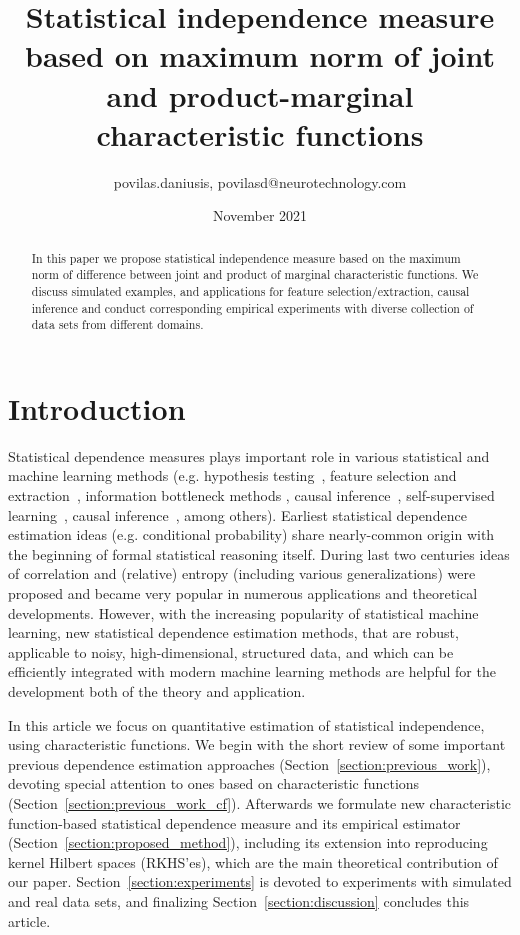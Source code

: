 \documentclass{article}
\title{Statistical independence measure based on maximum norm of joint and product-marginal characteristic functions}
\author{povilas.daniusis, povilasd@neurotechnology.com}
\date{November 2021}
\begin{document}
\maketitle

%

\begin{abstract}
    In this paper we propose statistical independence measure based on the maximum norm of difference between joint and product of marginal characteristic functions. We discuss simulated examples, and applications for feature selection/extraction, causal inference and conduct corresponding empirical experiments with diverse collection of data sets from different domains.
\end{abstract}

\section{Introduction}
Statistical dependence measures plays important role in various statistical and machine learning methods (e.g. hypothesis testing~\cite{Gretton2005MeasuringSD}, feature selection and extraction~\cite{EigenHSIC}, information bottleneck methods \cite{Ma2020TheHB}, causal inference~\cite{NIPS2008_f7664060}, self-supervised learning~\cite{li2021selfsupervised}, causal inference~\cite{NIPS2008_f7664060}, among others).  Earliest statistical dependence estimation ideas (e.g. conditional probability) share nearly-common origin with the beginning of formal statistical reasoning itself. During last two centuries ideas of correlation and (relative) entropy (including various generalizations) were proposed and became very popular in numerous applications and theoretical developments. However, with the increasing popularity of statistical machine learning, new statistical dependence estimation methods, that are robust, applicable to noisy, high-dimensional, structured data, and which can be efficiently integrated with modern machine learning methods are helpful for the development both of the theory and application.

In this article we focus on quantitative estimation of statistical independence, using characteristic functions. We begin with the short review of some important previous dependence estimation approaches (Section~\ref{section:previous_work}), devoting special attention to ones based on characteristic functions (Section~\ref{section:previous_work_cf}). Afterwards we formulate new characteristic function-based statistical dependence measure and its empirical estimator (Section~\ref{section:proposed_method}), including its extension into reproducing kernel Hilbert spaces (RKHS'es), which are the main theoretical contribution of our paper. Section~\ref{section:experiments} is devoted to experiments with simulated and real data sets, and finalizing Section~\ref{section:discussion} concludes this article.
\end{document}
